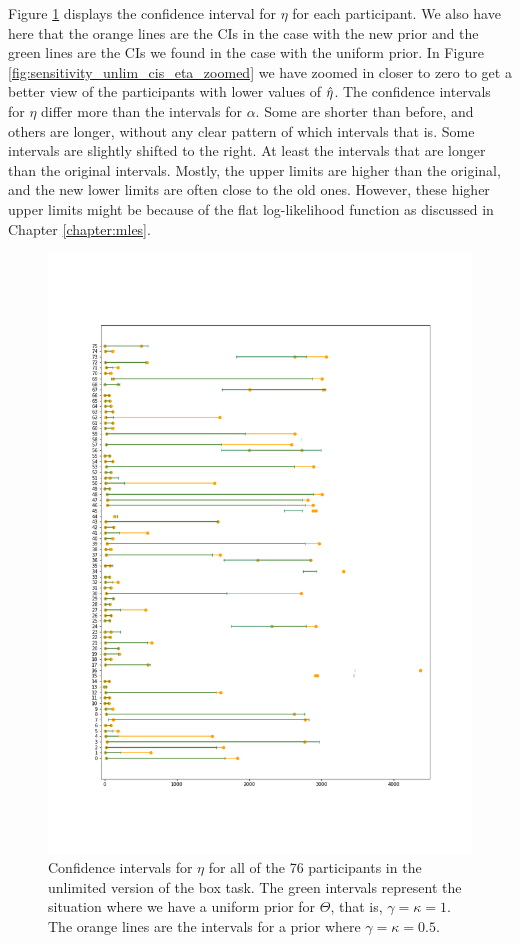 Figure \ref{fig:sensitivity_unlim_cis_eta} displays the confidence interval for $\eta$ for each participant. We also have here that the orange lines are the CIs in the case with the new prior and the green lines are the CIs we found in the case with the uniform prior. In Figure \ref{fig:sensitivity_unlim_cis_eta_zoomed} we have zoomed in closer to zero to get a better view of the participants with lower values of $\hat{\eta}$. The confidence intervals for $\eta$ differ more than the intervals for $\alpha$. 
Some are shorter than before, and others are longer, without any clear pattern of which intervals that is. Some intervals are slightly shifted to the right. At least the intervals that are longer than the original intervals. Mostly, the upper limits are higher than the original, and the new lower limits are often close to the old ones. 
However, these higher upper limits might be because of the flat log-likelihood function as discussed in Chapter \ref{chapter:mles}.
\begin{figure}
    \centering
    \includegraphics[scale=0.36]{pictures/Sensitivity/ci_unlim_eta.png}
    \caption[CIs for $\eta$ for all participants with two different priors, unlimited]{
    Confidence intervals for $\eta$ for all of the 76 participants in the unlimited version of the box task. The green intervals represent the situation where we have a uniform prior for $\Theta$, that is, $\gamma=\kappa=1$. The orange lines are the intervals for a prior where $\gamma=\kappa=0.5$.}
    \label{fig:sensitivity_unlim_cis_eta}
\end{figure}
